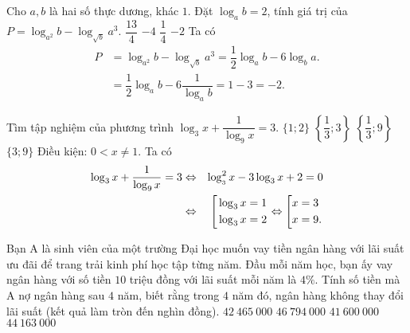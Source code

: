 \begin{ex}%
Cho $a,b$ là hai số thực dương, khác $1$. Đặt $\log _{a}b=2$, tính giá trị của $P=\log _{a^2}b-\log_{\sqrt{b}}{a^3}.$ 
\choice
{$\dfrac{13}{4}$}
{$-4$}
{$\dfrac{1}{4}$}
{\True $-2$}
\loigiai
{
Ta có
\begin{align*}
P&=\log_{a^2}b-\log_{\sqrt{b}}{a^3}
=\dfrac{1}{2} \log_{a}b-6 \log_{b}a. \\
&=\dfrac{1}{2} \log_{a}b-6 \dfrac{1}{\log_{a}b}=1-3=-2.
\end{align*}
}
\end{ex}

\begin{ex}%
Tìm tập nghiệm của phương trình $\log_{3}x+\dfrac{1}{\log_{9}x}=3$.
\choice
{$\{1;2\}$}
{$\left\{ \dfrac{1}{3};3 \right\}$}
{$\left\{ \dfrac{1}{3};9 \right\}$}
{\True $\{3;9\}$}
\loigiai
{
Điều kiện: $0<x\ne 1$. Ta có
\begin{eqnarray*}
\log_{3}x+\dfrac{1}{\log_{9}x}=3 &\Leftrightarrow &\log _{_{3}}^{2}x-3\log_{3}x+2=0\\
&\Leftrightarrow &\left[\begin{aligned}
&\log_{3}x=1  \\
&\log_{3}x=2  \\
\end{aligned}\right. \Leftrightarrow \left[\begin{aligned}
&x=3  \\
&x=9.  \\
\end{aligned}\right.
\end{eqnarray*}
}
\end{ex}

\begin{ex}%
Bạn A là sinh viên của một trường Đại học muốn vay tiền ngân hàng với lãi suất ưu đãi để trang trải kinh phí học tập từng năm. Đầu mỗi năm học, bạn ấy vay ngân hàng với số tiền $10$ triệu đồng với lãi suất mỗi năm là $4\%$. Tính số tiền mà A nợ ngân hàng sau $4$ năm, biết rằng trong $4$ năm đó, ngân hàng không thay đổi lãi suất (kết quả làm tròn đến nghìn đồng).
\choice
{$42 \ 465 \ 000$}
{$46 \ 794 \ 000$}
{$41 \ 600 \ 000$}
{\True $44 \ 163 \ 000$}
\end{ex}

